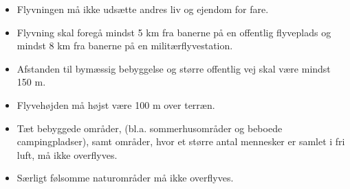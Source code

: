 \documentclass[Main]{subfiles}
\begin{document}
\begin{itemize}
\item Flyvningen må ikke udsætte andres liv og ejendom for fare\cite[s. 1]{Lov1}.
\item Flyvning skal foregå mindst 5 km fra banerne på en offentlig flyveplads og mindst 8 km fra banerne på en militærflyvestation\cite[s. 1]{Lov1}.
\item Afstanden til bymæssig bebyggelse og større offentlig vej skal være mindst 150 m\cite[s. 1]{Lov1}.
\item Flyvehøjden må højst være 100 m over terræn\cite[s. 2]{Lov1}.
\item Tæt bebyggede områder, (bl.a. sommerhusområder og beboede campingpladser), samt områder, hvor et større antal mennesker er samlet i fri luft, må ikke overflyves\cite[s. 2]{Lov1}.
\item Særligt følsomme naturområder må ikke overflyves\cite[s. 2]{Lov1}.
\end{itemize} 
\end{document}

